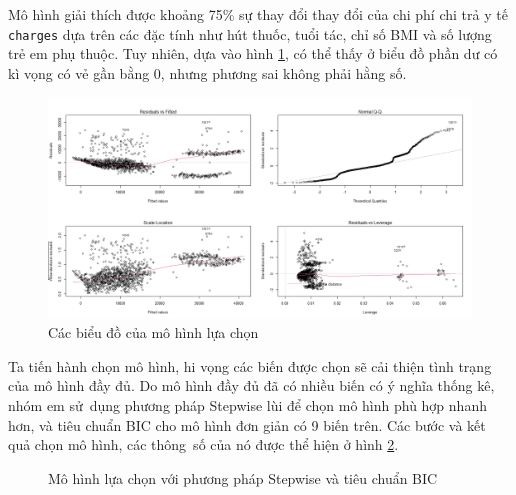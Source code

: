 Mô hình giải thích được khoảng 75\% sự thay đổi thay đổi của chi phí chi trả y tế \texttt{charges} dựa trên các đặc tính như hút thuốc, tuổi tác, chỉ số BMI và số lượng trẻ em phụ thuộc. Tuy nhiên, dựa vào hình \ref{fig-a1:model-full-plot}, có thể thấy ở biểu đồ phần dư có kì vọng có vẻ gần bằng 0, nhưng phương sai không phải hằng số.
\begin{figure}[H]
	\centering
	\includegraphics[width=0.8\linewidth]{images/A1/model-full-plot}
	\caption{Các biểu đồ của mô hình lựa chọn}
	\label{fig-a1:model-full-plot}
\end{figure}

Ta tiến hành chọn mô hình, hi vọng các biến được chọn sẽ cải thiện tình trạng của mô hình đầy đủ. Do mô hình đầy đủ đã có nhiều biến có ý nghĩa thống kê, nhóm em sử~dụng phương pháp Stepwise lùi để chọn mô hình phù hợp nhanh hơn, và tiêu chuẩn BIC cho mô hình đơn giản có 9 biến trên. Các bước và kết quả chọn mô hình, các thông~số của nó được thể hiện ở hình \ref{fig-a1:model-bic}.
\begin{figure}[H]
	\centering
	\hfill
	\caption{Mô hình lựa chọn với phương pháp Stepwise và tiêu chuẩn BIC}
	\label{fig-a1:model-bic}
\end{figure}

